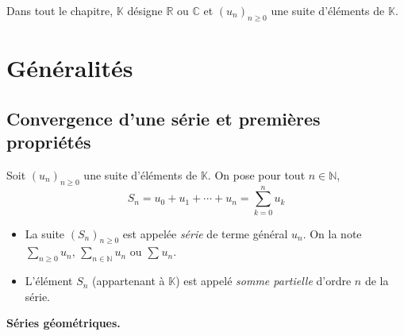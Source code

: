 \documentclass[french,11pt,twoside]{VcCours}
\newcommand{\Sum}[2]{\ensuremath{\textstyle{\sum\limits_{#1}^{#2}}}}
\begin{document}

\tableofcontents
\separationTitre

\newpage
Dans tout le chapitre, $\mathbb{K}$ désigne $\mathbb{R}$ ou $\mathbb{C}$ et $(u_n)_{n \geq 0}$ une suite d'éléments de $\mathbb{K}$.

\section{Généralités}
\subsection{Convergence d'une série et premières propriétés}
\begin{Definition}{}
Soit $(u_n)_{n \geq 0}$ une suite d'éléments de $\mathbb{K}$. On pose pour tout $n \in \mathbb{N}$,
$$ S_n =  u_0 + u_1 + \cdots + u_n = \sum_{k=0}^n u_k $$

\begin{itemize}
\item La suite $(S_n)_{n \geq 0}$ est appelée \emph{série} de terme général $u_n$. On la note $\Sum{n \geq 0}{} u_n$, $\Sum{n \in \mathbb{N}}{} u_n$ ou $\Sum{}{} u_n$.
\item L'élément $S_n$ (appartenant à $\mathbb{K}$) est appelé \emph{somme partielle} d'ordre $n$ de la série.
\end{itemize}
\end{Definition}

\begin{Exemple} \textbf{Séries géométriques.}

%
%

\vspace{5cm}
\end{Exemple}
\end{document}
